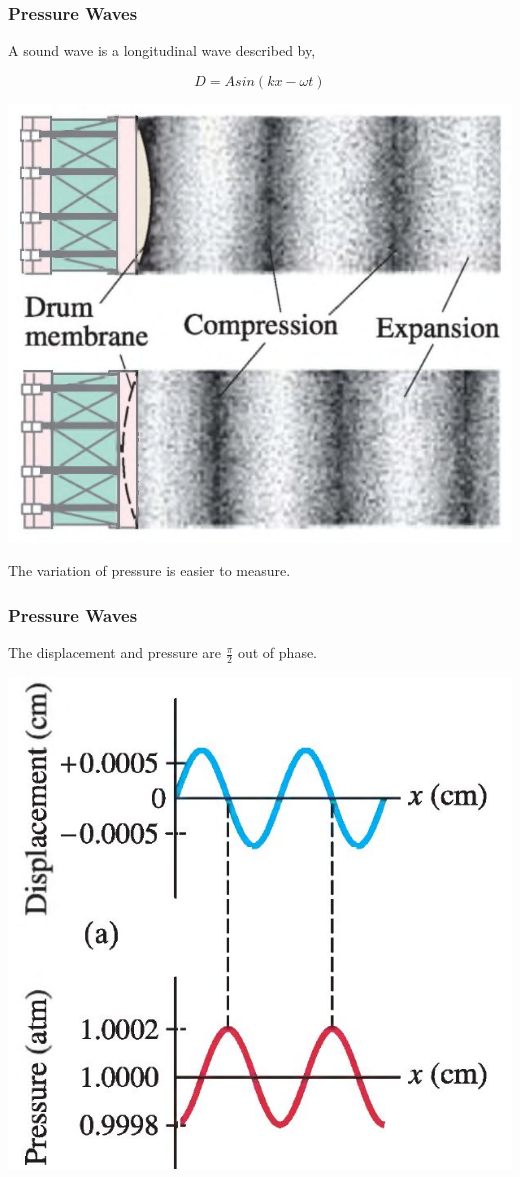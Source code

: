 \documentclass[]{beamer}
\begin{document}
\begin{frame}
\frametitle{Pressure Waves}

A sound wave is a longitudinal wave described by,

\pause

\begin{equation*}
D=Asin(kx-\omega t)
\end{equation*}

\pause
  \begin{center}
  \includegraphics[height=2.in]{images4/5.jpg}
\end{center}

\pause
The variation of pressure is easier to measure.
  \end{frame}


\begin{frame}
\frametitle{Pressure Waves}

The displacement and pressure are $\frac{\pi}{2}$ out of phase.
  \begin{center}
  \includegraphics[height=2.in]{images4/soundwave.jpg}
\end{center}

  \end{frame}



\end{document}
